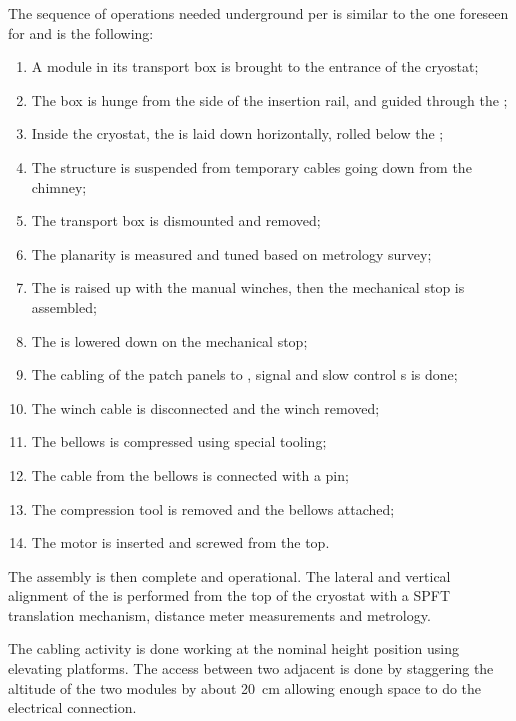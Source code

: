 

The sequence of operations needed underground per  is similar to the one foreseen for   and is the following: 
\begin{enumerate}
\item A  module in its transport box is brought to the entrance of the cryostat;
\item The box is hunge from the side of the insertion rail, and guided through the ;
\item  Inside the cryostat, the  is laid down horizontally, rolled below the ;
\item The structure is suspended from temporary cables going down from the chimney;
\item The transport box is dismounted and removed;
\item The  planarity is measured and tuned based on metrology survey;
\item The  is raised up with the manual winches, then the mechanical stop is assembled;
\item The  is lowered down  on the mechanical stop;
\item The cabling of the  patch panels to , signal and slow control \fdth{}s is done;
\item The winch cable is disconnected  and the winch removed;
\item The bellows is compressed using special tooling;
\item The cable from the bellows is connected with a pin;
\item The compression tool is removed and the bellows attached;
\item The motor is inserted and screwed from the top.
\end{enumerate}
 

The assembly is then complete and operational.
The lateral and vertical alignment of the  is performed from the top of the cryostat with a SPFT translation mechanism, distance meter measurements and metrology.

The cabling activity is done  working at the nominal height position using elevating platforms. The access between two adjacent  is done by staggering the altitude of the two modules by about \SI{20}{cm} allowing enough space to do the electrical connection. 


